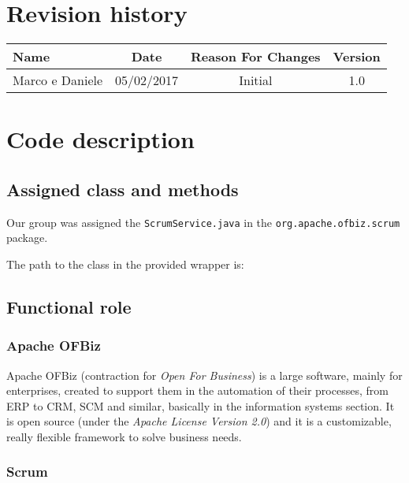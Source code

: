 \documentclass{scrreprt}
\begin{document}
\chapter*{Revision history}
\begin{center}
    \begin{tabular}{lccc}
        \toprule
	   \textbf{ Name }& \textbf{ Date  }& \textbf{ Reason For Changes }& \textbf{ Version}\\
        \midrule
	     Marco e Daniele & 05/02/2017 & Initial & 1.0\\
	\bottomrule
    \end{tabular}
\end{center}

\chapter{Code description}

\section{Assigned class and methods}

Our group was assigned the \texttt{ScrumService.java} in the \texttt{org.apache.ofbiz.scrum} package.

The path to the class in the provided wrapper is: 

\section{Functional role}

\subsection{Apache OFBiz\textsuperscript{\textregistered}}

Apache OFBiz (contraction for \emph{Open For Business}) is a large software, mainly for enterprises, created to support them in the automation of their processes, from ERP to CRM, SCM and similar, basically in the information systems section.
It is open source (under the \emph{Apache License Version 2.0}) and it is a customizable, really flexible framework to solve business needs.

\subsection{Scrum}
\end{document}
